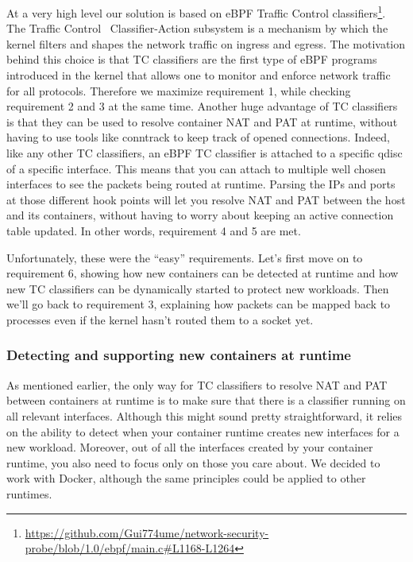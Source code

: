 At a very high level our solution is based on eBPF Traffic Control classifiers\footnote{\url{https://github.com/Gui774ume/network-security-probe/blob/1.0/ebpf/main.c#L1168-L1264}}. The Traffic Control~\cite{ProcessLevelNetworkSecurityMonitoring:TrafficControlManpage} Classifier-Action subsystem is a mechanism by which the kernel filters and shapes the network traffic on ingress and egress. The motivation behind this choice is that TC classifiers are the first type of eBPF programs introduced in the kernel that allows one to monitor and enforce network traffic for all protocols. Therefore we maximize requirement 1, while checking requirement 2 and 3 at the same time. Another huge advantage of TC classifiers is that they can be used to resolve container NAT and PAT at runtime, without having to use tools like conntrack to keep track of opened connections. Indeed, like any other TC classifiers, an eBPF TC classifier is attached to a specific qdisc of a specific interface. This means that you can attach to multiple well chosen interfaces to see the packets being routed at runtime. Parsing the IPs and ports at those different hook points will let you resolve NAT and PAT between the host and its containers, without having to worry about keeping an active connection table updated. In other words, requirement 4 and 5 are met.

Unfortunately, these were the “easy” requirements. Let’s first move on to requirement 6, showing how new containers can be detected at runtime and how new TC classifiers can be dynamically started to protect new workloads. Then we’ll go back to requirement 3, explaining how packets can be mapped back to processes even if the kernel hasn’t routed them to a socket yet.

\subsubsection{Detecting and supporting new containers at runtime}

As mentioned earlier, the only way for TC classifiers to resolve NAT and PAT between containers at runtime is to make sure that there is a classifier running on all relevant interfaces. Although this might sound pretty straightforward, it relies on the ability to detect when your container runtime creates new interfaces for a new workload. Moreover, out of all the interfaces created by your container runtime, you also need to focus only on those you care about. We decided to work with Docker, although the same principles could be applied to other runtimes.

